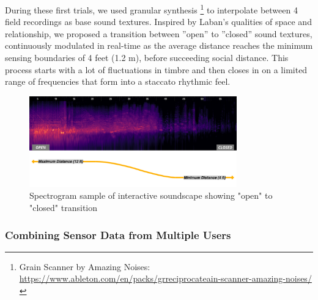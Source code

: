 During these first trials, we used granular synthesis \footnote{{Grain Scanner
by Amazing Noises: \url{https://www.ableton.com/en/packs/grreciprocateain-scanner-amazing-noises/}}} to interpolate between 4 field recordings as base sound textures. Inspired by Laban’s qualities of space and relationship, we proposed a transition between ”open” to ”closed” sound textures, continuously modulated in real-time as the average distance reaches the minimum sensing boundaries of 4 feet (1.2 m), before succeeding social distance. This process starts with a lot of fluctuations in timbre and then closes in on a limited range of frequencies that form into a staccato rhythmic feel.

\begin{figure}[!h]
\captionsetup{width=1.0\textwidth}
\centering
\includegraphics[width=0.8\textwidth,keepaspectratio]{Chapters/Figures/adse_ess/open_closed_examples_annotated_landscape_line_cont.png}
{\caption{Spectrogram sample of interactive soundscape showing "open" to "closed" transition}\label{fig:sound_examples}}
\end{figure}

\subsubsection{Combining Sensor Data from Multiple Users}

